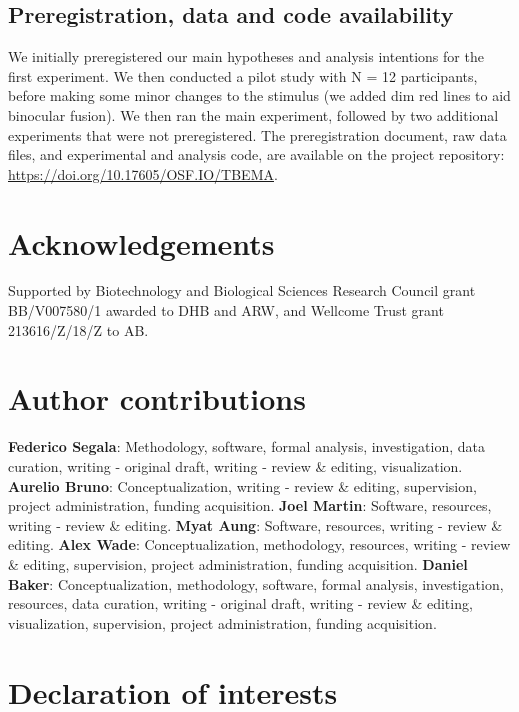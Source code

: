 \documentclass[
]{article}
\begin{document}
\hypertarget{preregistration-data-and-code-availability}{%
\subsection{Preregistration, data and code availability}\label{preregistration-data-and-code-availability}}

We initially preregistered our main hypotheses and analysis intentions for the first experiment. We then conducted a pilot study with N = 12 participants, before making some minor changes to the stimulus (we added dim red lines to aid binocular fusion). We then ran the main experiment, followed by two additional experiments that were not preregistered. The preregistration document, raw data files, and experimental and analysis code, are available on the project repository: \url{https://doi.org/10.17605/OSF.IO/TBEMA}.

\hypertarget{acknowledgements}{%
\section{Acknowledgements}\label{acknowledgements}}

Supported by Biotechnology and Biological Sciences Research Council grant BB/V007580/1 awarded to DHB and ARW, and Wellcome Trust grant 213616/Z/18/Z to AB.

\hypertarget{author-contributions}{%
\section{Author contributions}\label{author-contributions}}

\textbf{Federico Segala}: Methodology, software, formal analysis, investigation, data curation, writing - original draft, writing - review \& editing, visualization. \textbf{Aurelio Bruno}: Conceptualization, writing - review \& editing, supervision, project administration, funding acquisition. \textbf{Joel Martin}: Software, resources, writing - review \& editing. \textbf{Myat Aung}: Software, resources, writing - review \& editing. \textbf{Alex Wade}: Conceptualization, methodology, resources, writing - review \& editing, supervision, project administration, funding acquisition. \textbf{Daniel Baker}: Conceptualization, methodology, software, formal analysis, investigation, resources, data curation, writing - original draft, writing - review \& editing, visualization, supervision, project administration, funding acquisition.

\hypertarget{declaration-of-interests}{%
\section{Declaration of interests}\label{declaration-of-interests}}
\end{document}
